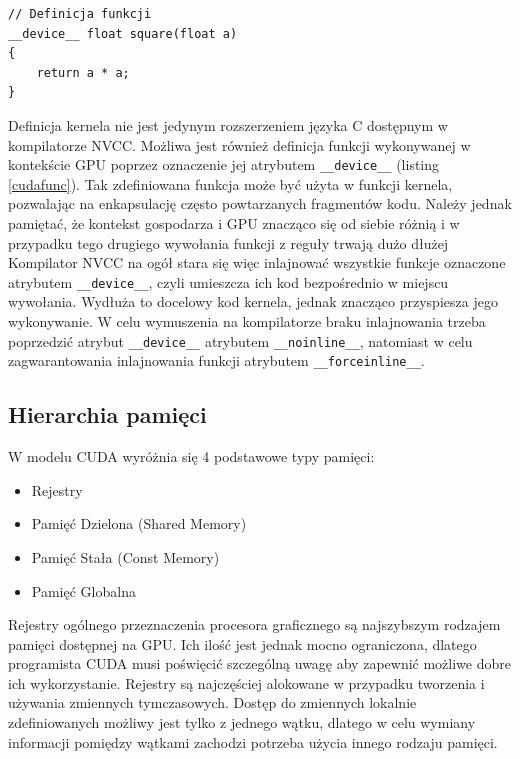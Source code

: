 \begin{lstlisting}[caption=Funkcje CUDA, label=cudafunc]
// Definicja funkcji
__device__ float square(float a)
{
	return a * a;
}
\end{lstlisting}

Definicja kernela nie jest jedynym rozszerzeniem języka C dostępnym w
kompilatorze NVCC. Możliwa jest również definicja funkcji wykonywanej w
kontekście GPU poprzez oznaczenie jej atrybutem \texttt{\_\_device\_\_} (listing
		\ref{cudafunc}). Tak zdefiniowana funkcja może być użyta w funkcji
kernela, pozwalając na enkapsulację często powtarzanych fragmentów kodu. Należy
jednak pamiętać, że kontekst gospodarza i GPU znacząco się od siebie różnią i w
przypadku tego drugiego wywołania funkcji z reguły trwają dużo
dłużej\cite{Nvi11b} Kompilator NVCC na ogół stara się więc inlajnować wszystkie
funkcje oznaczone atrybutem \texttt{\_\_device\_\_}, czyli umieszcza ich kod
bezpośrednio w miejscu wywołania. Wydłuża to docelowy kod kernela, jednak
znacząco przyspiesza jego wykonywanie. W celu wymuszenia na kompilatorze braku
inlajnowania trzeba poprzedzić atrybut \texttt{\_\_device\_\_} atrybutem
\texttt{\_\_noinline\_\_}, natomiast w celu zagwarantowania inlajnowania funkcji
atrybutem \texttt{\_\_forceinline\_\_}.

\subsection{Hierarchia pamięci}
\label{ssec:mem}

W modelu CUDA wyróżnia się 4 podstawowe typy pamięci:
\begin{itemize}
\item Rejestry
\item Pamięć Dzielona (Shared Memory)
\item Pamięć Stała (Const Memory)
\item Pamięć Globalna
\end{itemize}

Rejestry ogólnego przeznaczenia procesora graficznego są najszybszym rodzajem
pamięci dostępnej na GPU.  Ich ilość jest jednak mocno ograniczona, dlatego
programista CUDA musi poświęcić szczególną uwagę aby zapewnić możliwe dobre ich
wykorzystanie. Rejestry są najczęściej alokowane w przypadku tworzenia i
używania zmiennych tymczasowych. Dostęp do zmiennych lokalnie zdefiniowanych
możliwy jest tylko z jednego wątku, dlatego w celu wymiany informacji pomiędzy
wątkami zachodzi potrzeba użycia innego rodzaju pamięci.

